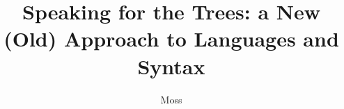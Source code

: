 \documentclass[defaultstyle,10pt]{thesis}
\title{Speaking for the Trees: a New (Old) Approach to Languages and Syntax}
\author{Moss}{Prescott}
\begin{document}






%




\nocite{*}		%




\end{document}
